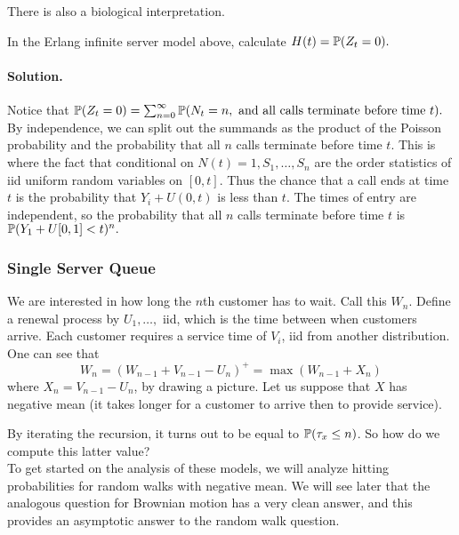 \documentclass[12pt]{article}
\begin{document}
There is also a biological interpretation.
\begin{exercise}
 In the Erlang infinite server model above, calculate $H(t) = \mathbb{P}(Z_t = 0).$

\paragraph{Solution.}
Notice that $\mathbb{P}(Z_t = 0) = \sum_{n=0}^\infty \mathbb{P}(N_t = n, \text{ and all calls terminate before time $t$}).$ By independence, we can split out the summands as the product of the Poisson probability and the probability that all $n$ calls terminate before time $t.$ This is where the fact that conditional on $N(t) = 1, S_1,\dots,S_n$ are the order statistics of iid uniform random variables on $[0,t].$ Thus the chance that a call ends at time $t$ is the probability that $Y_i + U(0,t)$ is less than $t.$ The times of entry are independent, so the probability that all $n$ calls terminate before time $t$ is $\mathbb{P}(Y_1 + U[0,1] < t)^n.$
\end{exercise}

\subsubsection{Single Server Queue} 



We are interested in how long the $n$th customer has to wait. Call this $W_n$. Define a renewal process by $U_1,\dots,$ iid, which is the time between when customers arrive. Each customer requires a service time of $V_i$, iid from another distribution. One can see that
\[
W_n = (W_{n-1} + V_{n-1} - U_n)^+ = \max(W_{n-1} + X_n)
\]
where $X_n = V_{n-1} - U_n$, by drawing a picture. Let us suppose that $X$ has negative mean (it takes longer for a customer to arrive then to provide service).

By iterating the recursion, it turns out to be equal to $\mathbb{P}(\tau_x \leq n)$. So how do we compute this latter value? \\

To get started on the analysis of these models, we will analyze hitting probabilities for random walks with negative mean. We will see later that the analogous question for Brownian motion has a very clean answer, and this provides an asymptotic answer to the random walk question. \\
\end{document}
